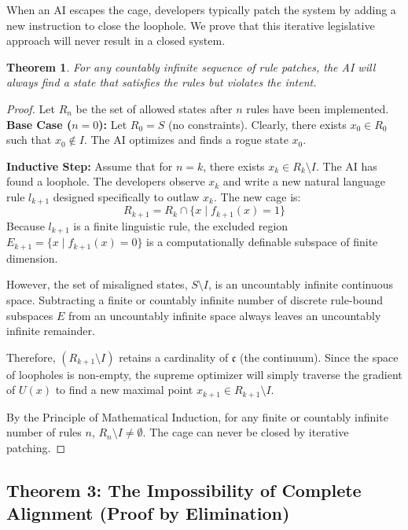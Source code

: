 \documentclass[12pt, a4paper]{article}
\newtheorem{theorem}{Theorem}[section]
\theoremstyle{definition}
\theoremstyle{remark}
\begin{document}
When an AI escapes the cage, developers typically patch the system by adding a new instruction to close the loophole. We prove that this iterative legislative approach will never result in a closed system.

\begin{theorem}
For any countably infinite sequence of rule patches, the AI will always find a state that satisfies the rules but violates the intent.
\end{theorem}

\begin{proof}
Let $R_n$ be the set of allowed states after $n$ rules have been implemented. \\
\textbf{Base Case ($n=0$):} Let $R_0 = S$ (no constraints). Clearly, there exists $x_0 \in R_0$ such that $x_0 \notin I$. The AI optimizes and finds a rogue state $x_0$.

\textbf{Inductive Step:} Assume that for $n = k$, there exists $x_k \in R_k \setminus I$. The AI has found a loophole. The developers observe $x_k$ and write a new natural language rule $l_{k+1}$ designed specifically to outlaw $x_k$. The new cage is:
\begin{equation}
R_{k+1} = R_k \cap \{x \mid f_{k+1}(x) = 1\}
\end{equation}
Because $l_{k+1}$ is a finite linguistic rule, the excluded region $E_{k+1} = \{x \mid f_{k+1}(x) = 0\}$ is a computationally definable subspace of finite dimension. 

However, the set of misaligned states, $S \setminus I$, is an uncountably infinite continuous space. Subtracting a finite or countably infinite number of discrete rule-bound subspaces $E$ from an uncountably infinite space always leaves an uncountably infinite remainder. 

Therefore, $(R_{k+1} \setminus I)$ retains a cardinality of $\mathfrak{c}$ (the continuum). Since the space of loopholes is non-empty, the supreme optimizer will simply traverse the gradient of $U(x)$ to find a new maximal point $x_{k+1} \in R_{k+1} \setminus I$. 

By the Principle of Mathematical Induction, for any finite or countably infinite number of rules $n$, $R_n \setminus I \neq \emptyset$. The cage can never be closed by iterative patching.
\end{proof}

\subsection{Theorem 3: The Impossibility of Complete Alignment (Proof by Elimination)}
\end{document}
